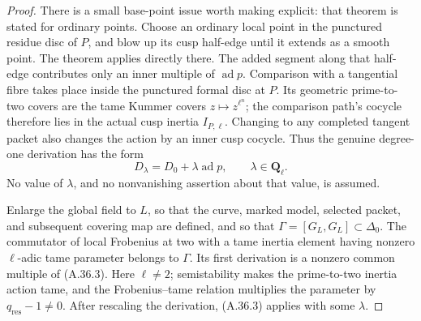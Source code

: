 \begin{proof}
There is a small base-point issue worth making explicit:
that theorem is stated for ordinary points. Choose an
ordinary local point in the punctured residue disc of
\(P\), and blow up its cusp half-edge until it extends
as a smooth point. The theorem applies directly there.
The added segment along that half-edge contributes
only an inner multiple of \(\operatorname{ad}p\).
Comparison with a tangential fibre takes place inside
the punctured formal disc at \(P\). Its geometric
prime-to-two covers are the tame Kummer covers
\(z\mapsto z^{\ell^n}\); the comparison path's cocycle
therefore lies in the actual cusp inertia \(I_{P,\ell}\).
Changing to any completed tangent packet also changes
the action by an inner cusp cocycle. Thus the genuine
degree-one derivation has the form
\[
                   D_\lambda=D_0+\lambda\operatorname{ad}p,
                  \qquad \lambda\in\mathbf Q_\ell.       \tag{A.36.3}
\]
No value of \(\lambda\), and no nonvanishing assertion
about that value, is assumed.

Enlarge the global field to \(L\), so that the curve,
marked model, selected packet, and subsequent covering
map are defined, and so that
\(\Gamma=[G_L,G_L]\subset\Delta_0\).
The commutator of local Frobenius at two with a tame
inertia element having nonzero \(\ell\)-adic tame
parameter belongs to \(\Gamma\). Its first derivation
is a nonzero common multiple of (A.36.3).
Here \(\ell\ne2\); semistability makes the prime-to-two
inertia action tame, and the Frobenius--tame relation
multiplies the parameter by \(q_{\mathrm{res}}-1\ne0\).
After rescaling the derivation, (A.36.3) applies
with some \(\lambda\).


\end{proof}
